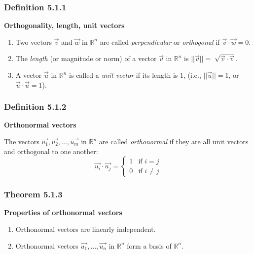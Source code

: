 \documentclass{report}
\begin{document}
\subsubsection*{Definition 5.1.1}
\par\noindent\textbf{Orthogonality, length, unit vectors}
\renewcommand{\labelenumi}{\textbf{\alph{enumi}.}}
\begin{enumerate}
\item Two vectors $\vec{v}$ and $\vec{w}$ in $\mathbb{R}^{n}$ are called \textit{perpendicular} or \textit{orthogonal} if $\vec{v}\cdot\vec{w}=0$.
\item The \textit{length} (or magnitude or norm) of a vector $\vec{v}$ in $\mathbb{R}^{n}$ is $||\vec{v}||=\sqrt[]{\vec{v}\cdot\vec{v}}$.
\item A vector $\vec{u}$ in $\mathbb{R}^{n}$ is called a \textit{unit vector} if its length is $1$, (i.e., $||\vec{u}||=1$, or $\vec{u}\cdot\vec{u}=1$).
\end{enumerate}
\subsubsection*{Definition 5.1.2}
\par\noindent\textbf{Orthonormal vectors}
\par\noindent The vectors $\vec{u_{1}},\vec{u_{2}},\ldots{},\vec{u_{m}}$ in $\mathbb{R}^{n}$ are called \textit{orthonormal} if they are all unit vectors and orthogonal to one another:
\[\vec{u_{i}}\cdot{}\vec{u_{j}}=\begin{cases}1 & \textrm{if }i=j\\ 0 & \textrm{if } i\ne{}j\end{cases}\]
\subsubsection*{Theorem 5.1.3}
\par\noindent\textbf{Properties of orthonormal vectors}
\renewcommand{\labelenumi}{\textbf{\alph{enumi}.}}
\begin{enumerate}
\item Orthonormal vectors are linearly independent.
\item Orthonormal vectors $\vec{u_{1}},\ldots{},\vec{u_{n}}$ in $\mathbb{R}^{n}$ form a basis of $\mathbb{R}^{n}$.
\end{enumerate}
\end{document}
